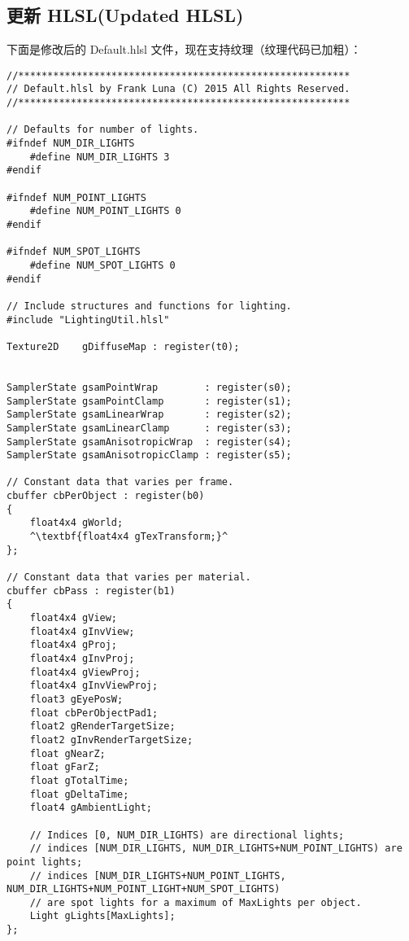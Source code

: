 \subsection{更新 HLSL(Updated HLSL)}
\begin{flushleft}
下面是修改后的 Default.hlsl 文件，现在支持纹理（纹理代码已加粗）：\\
\end{flushleft}

\begin{lstlisting}[escapechar=^]
//*********************************************************
// Default.hlsl by Frank Luna (C) 2015 All Rights Reserved.
//*********************************************************

// Defaults for number of lights.
#ifndef NUM_DIR_LIGHTS
    #define NUM_DIR_LIGHTS 3
#endif

#ifndef NUM_POINT_LIGHTS
    #define NUM_POINT_LIGHTS 0
#endif

#ifndef NUM_SPOT_LIGHTS
    #define NUM_SPOT_LIGHTS 0
#endif

// Include structures and functions for lighting.
#include "LightingUtil.hlsl"

Texture2D    gDiffuseMap : register(t0);


SamplerState gsamPointWrap        : register(s0);
SamplerState gsamPointClamp       : register(s1);
SamplerState gsamLinearWrap       : register(s2);
SamplerState gsamLinearClamp      : register(s3);
SamplerState gsamAnisotropicWrap  : register(s4);
SamplerState gsamAnisotropicClamp : register(s5);

// Constant data that varies per frame.
cbuffer cbPerObject : register(b0)
{
    float4x4 gWorld;
    ^\textbf{float4x4 gTexTransform;}^
};

// Constant data that varies per material.
cbuffer cbPass : register(b1)
{
    float4x4 gView;
    float4x4 gInvView;
    float4x4 gProj;
    float4x4 gInvProj;
    float4x4 gViewProj;
    float4x4 gInvViewProj;
    float3 gEyePosW;
    float cbPerObjectPad1;
    float2 gRenderTargetSize;
    float2 gInvRenderTargetSize;
    float gNearZ;
    float gFarZ;
    float gTotalTime;
    float gDeltaTime;
    float4 gAmbientLight;

    // Indices [0, NUM_DIR_LIGHTS) are directional lights;
    // indices [NUM_DIR_LIGHTS, NUM_DIR_LIGHTS+NUM_POINT_LIGHTS) are point lights;
    // indices [NUM_DIR_LIGHTS+NUM_POINT_LIGHTS, NUM_DIR_LIGHTS+NUM_POINT_LIGHT+NUM_SPOT_LIGHTS)
    // are spot lights for a maximum of MaxLights per object.
    Light gLights[MaxLights];
};


\end{lstlisting}
